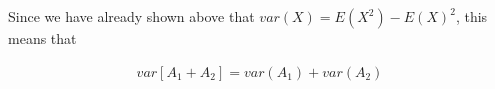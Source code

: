 \begin{enumerate}
Since we have already shown above that $var(X)=E(X^2) - E(X)^2$, this means that 

\begin{equation*}
\begin{aligned}
var [A_1 + A_2] = var(A_1) + var(A_2)
\end{aligned}
\end{equation*} 

  \end{enumerate}

